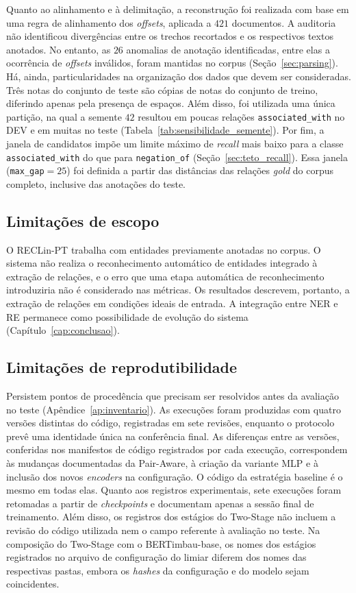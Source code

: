 Quanto ao alinhamento e à delimitação, a reconstrução foi realizada com base em uma regra de alinhamento dos \emph{offsets}, aplicada a $421$ documentos. A auditoria não identificou divergências entre os trechos recortados e os respectivos textos anotados. No entanto, as $26$ anomalias de anotação identificadas, entre elas a ocorrência de \emph{offsets} inválidos, foram mantidas no corpus (Seção~\ref{sec:parsing}). Há, ainda, particularidades na organização dos dados que devem ser consideradas. Três notas do conjunto de teste são cópias de notas do conjunto de treino, diferindo apenas pela presença de espaços. Além disso, foi utilizada uma única partição, na qual a semente $42$ resultou em poucas relações \texttt{associated\_with} no DEV e em muitas no teste (Tabela~\ref{tab:sensibilidade_semente}). Por fim, a janela de candidatos impõe um limite máximo de \emph{recall} mais baixo para a classe \texttt{associated\_with} do que para \texttt{negation\_of} (Seção~\ref{sec:teto_recall}). Essa janela
(\texttt{max\_gap}$=25$) foi definida a partir das distâncias das relações
\emph{gold} do corpus completo, inclusive das anotações do teste.

\subsection{Limitações de escopo}

O RECLin-PT trabalha com entidades previamente anotadas no corpus. O sistema não
realiza o reconhecimento automático de entidades integrado à extração de relações, e
o erro que uma etapa automática de reconhecimento introduziria não é considerado nas
métricas. Os resultados descrevem, portanto, a extração de relações em condições
ideais de entrada. A integração entre NER e RE permanece como possibilidade de
evolução do sistema (Capítulo~\ref{cap:conclusao}).

\subsection{Limitações de reprodutibilidade}

Persistem pontos de procedência que precisam ser resolvidos antes da avaliação no
teste (Apêndice~\ref{ap:inventario}). As execuções foram produzidas com quatro
versões distintas do código, registradas em sete revisões, enquanto o protocolo prevê
uma identidade única na conferência final. As diferenças entre as versões,
conferidas nos manifestos de código registrados por cada execução, correspondem às
mudanças documentadas da Pair-Aware, à criação da variante MLP e à inclusão dos novos
\emph{encoders} na configuração. O código da estratégia baseline é o mesmo em todas
elas. Quanto aos registros experimentais, sete execuções foram retomadas a partir de \emph{checkpoints} e documentam apenas a sessão final de treinamento. Além disso, os registros dos estágios do Two-Stage não incluem a revisão do código utilizada nem o campo referente à avaliação no teste. Na composição do Two-Stage com o BERTimbau-base, os nomes dos estágios registrados no arquivo de configuração do limiar diferem dos nomes das respectivas pastas, embora os \emph{hashes} da configuração e do modelo sejam coincidentes.

